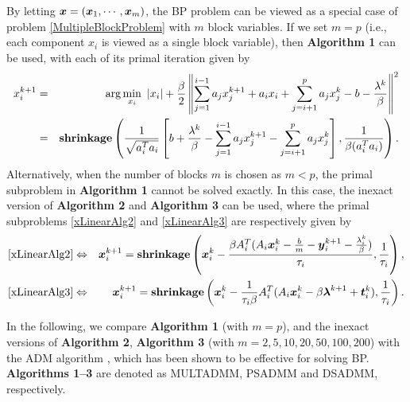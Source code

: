 \documentclass{mcom-l}
\theoremstyle{definition}
\theoremstyle{remark}
\numberwithin{equation}{section}
\begin{document}
By letting ${{\mbox{\boldmath $x$}}} = ({{\mbox{\boldmath $x$}}}_1,\cdots,{{\mbox{\boldmath $x$}}}_m)$, the BP problem can be viewed as a special case of problem \eqref{MultipleBlockProblem} with $m$ block variables. If we set $m=p$ (i.e., each component $x_i$ is
viewed as a single block variable), then {\bf Algorithm 1} can be used, with each of its primal iteration given by
\begin{eqnarray}
x_i^{k+1}&=&\arg\min_{x_i}\ \left|x_i\right| + \frac{\beta}{2}\left\|\sum_{j=1}^{i-1} a_j x_j^{k+1} + a_i x_i + \sum_{j = i+1}^p a_j x_j^k -b - \frac{\lambda^k}{\beta}\right\|^2\nonumber\\
&=& {\bf{shrinkage}}\left( \frac{1}{\sqrt{a_i^T a_i}} \left[ b + \frac{\lambda^k}{\beta} - \sum_{j=1}^{i-1} a_j x_j^{k+1} - \sum_{j = i+1}^p a_j x_j^k \right], \frac{1}{\beta (a_i^T a_i)} \right).
\end{eqnarray}
Alternatively, when the number of blocks $m$ is chosen as $m<p$, the primal subproblem in {\bf Algorithm 1} cannot be solved exactly. In this case, the inexact version of {\bf{Algorithm 2}} and {\bf{Algorithm 3}} can be used, where the primal subproblems \eqref{xLinearAlg2} and \eqref{xLinearAlg3} are respectively given by
\begin{eqnarray}
\eqref{xLinearAlg2}&\Leftrightarrow&{{\mbox{\boldmath $x$}}}_i^{k+1} = {\bf{shrinkage}}\left({{\mbox{\boldmath $x$}}}_i^k - \frac{\beta A_i^T( A_i {{\mbox{\boldmath $x$}}}_i^k - \frac{b}{m} - {{\mbox{\boldmath $y$}}}_i^{k+1} - \frac{\lambda_i^k}{\beta})}{\tau_i},\frac{1}{\tau_i}\right),\nonumber\\
\eqref{xLinearAlg3}&\Leftrightarrow&{{\mbox{\boldmath $x$}}}_i^{k+1} = {\bf{shrinkage}}\left({{\mbox{\boldmath $x$}}}_i^k - \frac{1}{\tau_i\beta}A_i^T( A_i {{\mbox{\boldmath $x$}}}_i^k - \beta {{\mbox{\boldmath $\lambda$}}}^{k+1} +{{\mbox{\boldmath $t$}}}_i^k),\frac{1}{\tau_i}\right).\nonumber
\end{eqnarray}

In the following, we compare {\bf{Algorithm 1}} (with $m = p$), and the inexact versions of {\bf{Algorithm 2}}, {\bf{Algorithm 3}} (with $m = 2,5,10,20,50,100,200$) with the ADM algorithm \cite{YangZhang2011}, which has been shown to be effective for solving BP. {\bf Algorithms 1--3} are denoted as MULTADMM, PSADMM and DSADMM, respectively.
\end{document}
